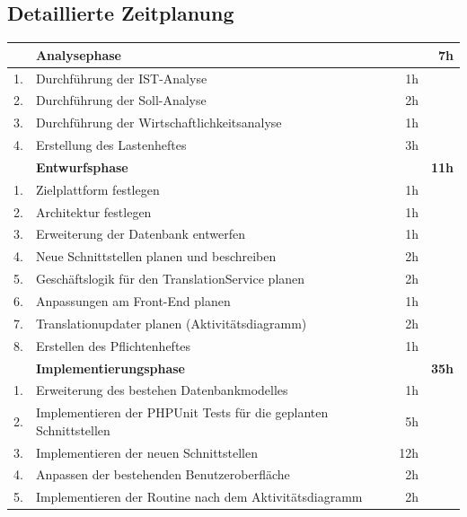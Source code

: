 \documentclass[10pt, oneside, ngerman]{article}
\begin{document}
  \subsection{Detaillierte Zeitplanung}\label{sec:detailTime}
  \begin{table}[ht]
    \centering
  \begin{tabular}{l l  r r}
    \hline
      \rowcolor{carolinablue}
      &\textbf{Analysephase} && \textbf{7h} \\
    \hline
      1. & Durchführung der IST-Analyse & 1h & \\
      \rowcolor{lightgray}
      2. & Durchführung der Soll-Analyse & 2h & \\
      3. & Durchführung der Wirtschaftlichkeitsanalyse & 1h & \\
      \rowcolor{lightgray}
      4. & Erstellung des Lastenheftes & 3h\\
      \rowcolor{carolinablue}
      &\textbf{Entwurfsphase} && \textbf{11h} \\
      \hline
      1.& Zielplattform festlegen & 1h &\\
      \rowcolor{lightgray}
      2.& Architektur festlegen & 1h &\\
      3.& Erweiterung der Datenbank entwerfen & 1h &\\
      \rowcolor{lightgray}
      4.& Neue Schnittstellen planen und beschreiben & 2h &\\
      5.& Geschäftslogik für den TranslationService planen &2h  & \\
      \rowcolor{lightgray}
      6.& Anpassungen am Front-End planen & 1h & \\
      7.& Translationupdater planen (Aktivitätsdiagramm) & 2h &\\
      8.& Erstellen des Pflichtenheftes  & 1h&\\
      \rowcolor{carolinablue}
      &\textbf{Implementierungsphase} && \textbf{35h} \\ 
      \hline
      1.& Erweiterung des bestehen Datenbankmodelles & 1h &\\
      \rowcolor{lightgray}
      2.& Implementieren der PHPUnit Tests für die geplanten Schnittstellen & 5h &\\
      3.& Implementieren der neuen Schnittstellen & 12h &\\
      \rowcolor{lightgray}
      4.& Anpassen der bestehenden Benutzeroberfläche & 2h &\\
      5.& Implementieren der Routine nach dem Aktivitätsdiagramm & 2h &\\

\end{tabular}
\end{table}
\end{document}
